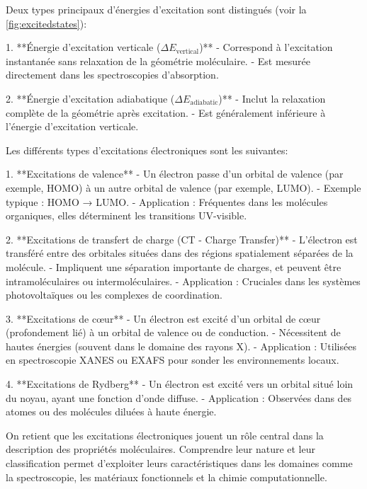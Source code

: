 \documentclass[12pt,a4paper]{report}
\begin{document}
\begin{markdown}
Deux types principaux d'énergies d'excitation sont distingués (voir la \autoref{fig:excitedstates}):

1. **Énergie d'excitation verticale (\( \Delta E_{\text{vertical}} \))**
   - Correspond à l'excitation instantanée sans relaxation de la géométrie moléculaire.
   - Est mesurée directement dans les spectroscopies d'absorption.

2. **Énergie d'excitation adiabatique (\( \Delta E_{\text{adiabatic}} \))**
   - Inclut la relaxation complète de la géométrie après excitation.
   - Est généralement inférieure à l'énergie d'excitation verticale.

Les différents types d'excitations électroniques sont les suivantes:

1. **Excitations de valence**
   - Un électron passe d'un orbital de valence (par exemple, HOMO) à un autre orbital de valence (par exemple, LUMO).
   - Exemple typique : HOMO → LUMO.
   - Application : Fréquentes dans les molécules organiques, elles déterminent les transitions UV-visible.

2. **Excitations de transfert de charge (CT - Charge Transfer)**
   - L'électron est transféré entre des orbitales situées dans des régions spatialement séparées de la molécule.
   - Impliquent une séparation importante de charges, et peuvent être intramoléculaires ou intermoléculaires.
   - Application : Cruciales dans les systèmes photovoltaïques ou les complexes de coordination.

3. **Excitations de cœur**
   - Un électron est excité d'un orbital de cœur (profondement lié) à un orbital de valence ou de conduction.
   - Nécessitent de hautes énergies (souvent dans le domaine des rayons X).
   - Application : Utilisées en spectroscopie XANES ou EXAFS pour sonder les environnements locaux.

4. **Excitations de Rydberg**
   - Un électron est excité vers un orbital situé loin du noyau, ayant une fonction d'onde diffuse.
   - Application : Observées dans des atomes ou des molécules diluées à haute énergie.

On retient que les excitations électroniques jouent un rôle central dans la description des propriétés moléculaires. Comprendre leur nature et leur classification permet d’exploiter leurs caractéristiques dans les domaines comme la spectroscopie, les matériaux fonctionnels et la chimie computationnelle.


\end{markdown}
\end{document}
